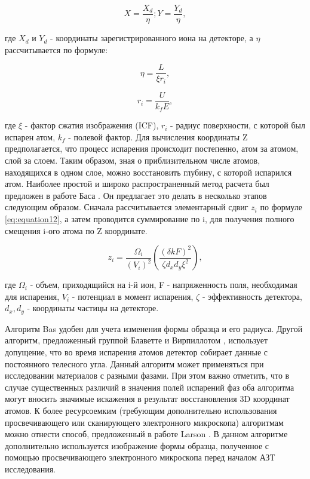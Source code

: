\begin{equation}
	\label{eq:equation9}
	X = \frac{X_d}{\eta}; Y = \frac{Y_d}{\eta},
\end{equation} 

где $X_d$ и $Y_d$ - координаты зарегистрированного иона на детекторе, а $\eta$ рассчитывается по формуле:

\begin{equation}
	\label{eq:equation10}
	\eta = \frac{L}{\xi r_i},
\end{equation}

\begin{equation}
	\label{eq:equation11}
	r_i = \frac{U}{k_f E},
\end{equation}

где $\xi$ - фактор сжатия изображения (ICF), $r_i$ - радиус поверхности, с которой был испарен атом, $k_f$ - полевой фактор. Для вычисления координаты Z предполагается, что процесс испарения происходит постепенно, атом за атомом, слой за слоем. Таким образом, зная о приблизительном числе атомов, находящихся в одном слое, можно восстановить глубину, с которой испарился атом. Наиболее простой и широко распространенный метод расчета был предложен в работе Баса \cite{Bas95}. Он предлагает это делать в несколько этапов следующим образом. Сначала рассчитывается элементарный сдвиг $z_i$ по формуле \cref{eq:equation12}, а затем проводится суммирование по i, для получения полного смещения i-ого атома по Z координате.

\begin{equation}
	\label{eq:equation12}
	z_i = \frac{\Omega_i}{(V_i)^2} \left(\frac{(\delta k F)^2}{\zeta d_x d_y \xi^2}\right),
\end{equation}

где  $\Omega_i$ - объем, приходящийся на i-й ион, F - напряженность поля, необходимая для испарения, $V_i$  - потенциал в момент испарения, $\zeta$ - эффективность детектора, $d_x, d_y$ - координаты частицы на детекторе.

Алгоритм Bas удобен для учета изменения формы образца и его радиуса. Другой алгоритм, предложенный группой Блаветте и Вирпиллотом \cite{Vurpillot11,Gault11}, использует допущение, что во время испарения атомов детектор собирает данные с постоянного телесного угла. Данный алгоритм может применяться при исследовании материалов с разными фазами. При этом важно отметить, что в случае существенных различий в значения полей испарений фаз оба алгоритма могут вносить значимые искажения в результат восстановления 3D координат атомов. К более ресурсоемким (требующим дополнительно использования просвечивающего или сканирующего электронного микроскопа) алгоритмам можно отнести способ, предложенный в работе Larson \cite{Larson11}. В данном алгоритме дополнительно используется изображение формы образца, полученное с помощью просвечивающего электронного микроскопа перед началом АЗТ исследования.

